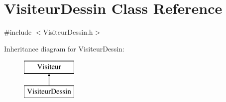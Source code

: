 \hypertarget{class_visiteur_dessin}{}\section{Visiteur\+Dessin Class Reference}
\label{class_visiteur_dessin}


{\ttfamily \#include $<$Visiteur\+Dessin.\+h$>$}

Inheritance diagram for Visiteur\+Dessin\+:\begin{figure}[H]
\begin{center}
\leavevmode
\includegraphics[height=2.000000cm]{class_visiteur_dessin}
\end{center}
\end{figure}
